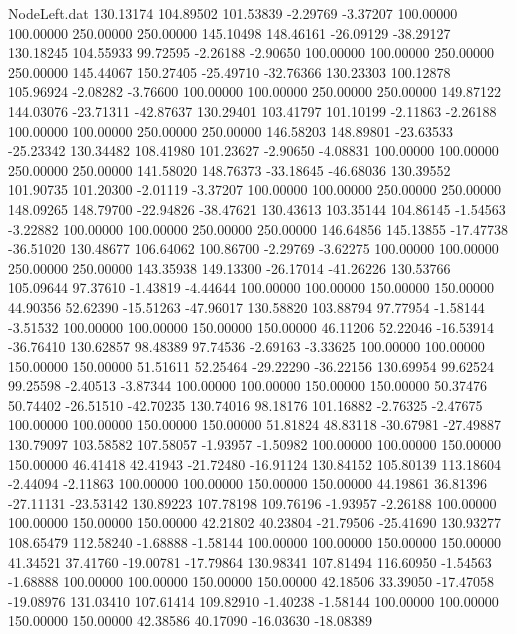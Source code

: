 \begin{filecontents}{NodeLeft.dat}
 130.13174  104.89502  101.53839    -2.29769   -3.37207  100.00000  100.00000  250.00000  250.00000  145.10498  148.46161  -26.09129  -38.29127
 130.18245  104.55933   99.72595    -2.26188   -2.90650  100.00000  100.00000  250.00000  250.00000  145.44067  150.27405  -25.49710  -32.76366
 130.23303  100.12878  105.96924    -2.08282   -3.76600  100.00000  100.00000  250.00000  250.00000  149.87122  144.03076  -23.71311  -42.87637
 130.29401  103.41797  101.10199    -2.11863   -2.26188  100.00000  100.00000  250.00000  250.00000  146.58203  148.89801  -23.63533  -25.23342
 130.34482  108.41980  101.23627    -2.90650   -4.08831  100.00000  100.00000  250.00000  250.00000  141.58020  148.76373  -33.18645  -46.68036
 130.39552  101.90735  101.20300    -2.01119   -3.37207  100.00000  100.00000  250.00000  250.00000  148.09265  148.79700  -22.94826  -38.47621
 130.43613  103.35144  104.86145    -1.54563   -3.22882  100.00000  100.00000  250.00000  250.00000  146.64856  145.13855  -17.47738  -36.51020
 130.48677  106.64062  100.86700    -2.29769   -3.62275  100.00000  100.00000  250.00000  250.00000  143.35938  149.13300  -26.17014  -41.26226
 130.53766  105.09644   97.37610    -1.43819   -4.44644  100.00000  100.00000  150.00000  150.00000   44.90356   52.62390  -15.51263  -47.96017
 130.58820  103.88794   97.77954    -1.58144   -3.51532  100.00000  100.00000  150.00000  150.00000   46.11206   52.22046  -16.53914  -36.76410
 130.62857   98.48389   97.74536    -2.69163   -3.33625  100.00000  100.00000  150.00000  150.00000   51.51611   52.25464  -29.22290  -36.22156
 130.69954   99.62524   99.25598    -2.40513   -3.87344  100.00000  100.00000  150.00000  150.00000   50.37476   50.74402  -26.51510  -42.70235
 130.74016   98.18176  101.16882    -2.76325   -2.47675  100.00000  100.00000  150.00000  150.00000   51.81824   48.83118  -30.67981  -27.49887
 130.79097  103.58582  107.58057    -1.93957   -1.50982  100.00000  100.00000  150.00000  150.00000   46.41418   42.41943  -21.72480  -16.91124
 130.84152  105.80139  113.18604    -2.44094   -2.11863  100.00000  100.00000  150.00000  150.00000   44.19861   36.81396  -27.11131  -23.53142
 130.89223  107.78198  109.76196    -1.93957   -2.26188  100.00000  100.00000  150.00000  150.00000   42.21802   40.23804  -21.79506  -25.41690
 130.93277  108.65479  112.58240    -1.68888   -1.58144  100.00000  100.00000  150.00000  150.00000   41.34521   37.41760  -19.00781  -17.79864
 130.98341  107.81494  116.60950    -1.54563   -1.68888  100.00000  100.00000  150.00000  150.00000   42.18506   33.39050  -17.47058  -19.08976
 131.03410  107.61414  109.82910    -1.40238   -1.58144  100.00000  100.00000  150.00000  150.00000   42.38586   40.17090  -16.03630  -18.08389

\end{filecontents}
